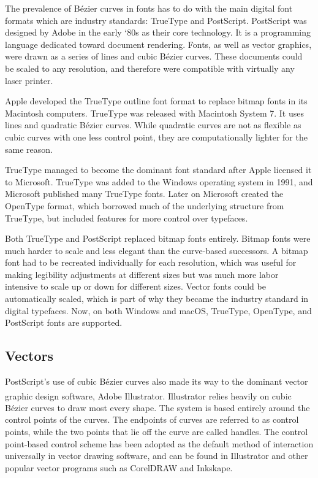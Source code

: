 \documentclass[12pt,letterpaper]{article}
\begin{document}
The prevalence of B\'ezier curves in fonts has to do with the main digital font formats which are industry standards: TrueType and PostScript. PostScript was designed by Adobe in the early ‘80s as their core technology. It is a programming language dedicated toward document rendering. Fonts, as well as vector graphics, were drawn as a series of lines and cubic B\'ezier curves. These documents could be scaled to any resolution, and therefore were compatible with virtually any laser printer. 

Apple developed the TrueType outline font format to replace bitmap fonts in its Macintosh computers. TrueType was released with Macintosh System 7. It uses lines and quadratic B\'ezier curves. While quadratic curves are not as flexible as cubic curves with one less control point, they are computationally lighter for the same reason.

TrueType managed to become the dominant font standard after Apple licensed it to Microsoft. TrueType was added to the Windows operating system in 1991, and Microsoft published many TrueType fonts. Later on Microsoft created the OpenType format, which borrowed much of the underlying structure from TrueType, but included features for more control over typefaces. 

Both TrueType and PostScript replaced bitmap fonts entirely. Bitmap fonts were much harder to scale and less elegant than the curve-based successors. A bitmap font had to be recreated individually for each resolution, which was useful for making legibility adjustments at different sizes but was much more labor intensive to scale up or down for different sizes. Vector fonts could be automatically scaled, which is part of why they became the industry standard in digital typefaces. Now, on both Windows and macOS, TrueType, OpenType, and PostScript fonts are supported.


\subsection{Vectors}

PostScript’s use of cubic B\'ezier curves also made its way to the dominant vector graphic design software, Adobe Illustrator\textsuperscript{\textregistered{}}. Illustrator relies heavily on cubic B\'ezier curves to draw most every shape. The system is based entirely around the control points of the curves. The endpoints of curves are referred to as control points, while the two points that lie off the curve are called handles. The control point-based control scheme has been adopted as the default method of interaction universally in vector drawing software, and can be found in Illustrator and other popular vector programs such as CorelDRAW and Inkskape. 
\end{document}
